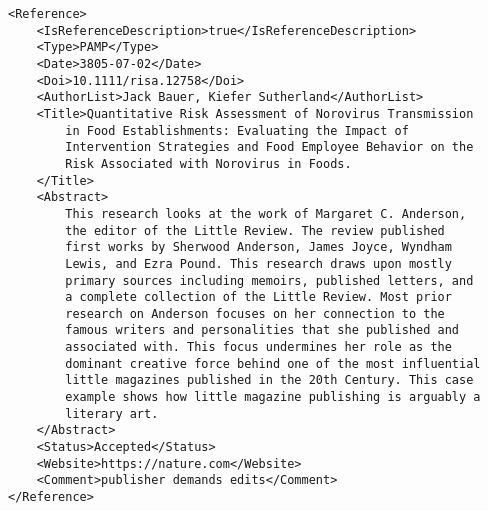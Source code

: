 \documentclass[a4paper]{report}
\begin{document}
\begin{lstlisting}[basicstyle=\footnotesize]
<Reference>
    <IsReferenceDescription>true</IsReferenceDescription>
    <Type>PAMP</Type>
    <Date>3805-07-02</Date>
    <Doi>10.1111/risa.12758</Doi>
    <AuthorList>Jack Bauer, Kiefer Sutherland</AuthorList>
    <Title>Quantitative Risk Assessment of Norovirus Transmission
        in Food Establishments: Evaluating the Impact of
        Intervention Strategies and Food Employee Behavior on the
        Risk Associated with Norovirus in Foods.
    </Title>
    <Abstract>
        This research looks at the work of Margaret C. Anderson,
        the editor of the Little Review. The review published
        first works by Sherwood Anderson, James Joyce, Wyndham
        Lewis, and Ezra Pound. This research draws upon mostly
        primary sources including memoirs, published letters, and
        a complete collection of the Little Review. Most prior
        research on Anderson focuses on her connection to the
        famous writers and personalities that she published and
        associated with. This focus undermines her role as the
        dominant creative force behind one of the most influential
        little magazines published in the 20th Century. This case
        example shows how little magazine publishing is arguably a
        literary art.
    </Abstract>
    <Status>Accepted</Status>
    <Website>https://nature.com</Website>
    <Comment>publisher demands edits</Comment>
</Reference>
\end{lstlisting}    

\end{document}

